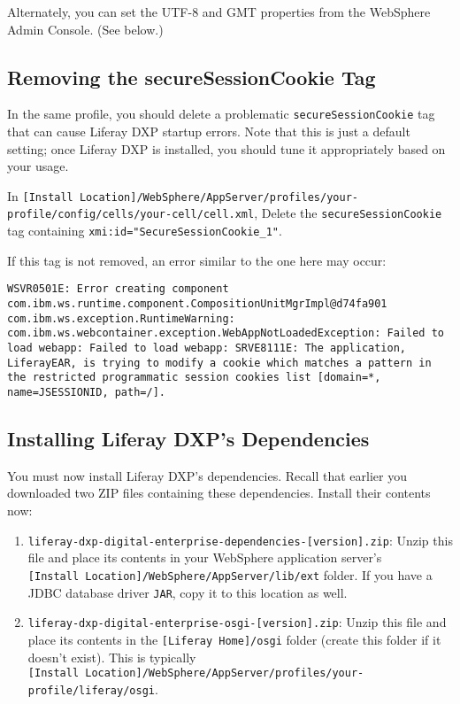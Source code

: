 \noindent\hrulefill

Alternately, you can set the UTF-8 and GMT properties from the WebSphere
Admin Console. (See below.)

\subsection{Removing the secureSessionCookie
Tag}\label{removing-the-securesessioncookie-tag}

In the same profile, you should delete a problematic
\texttt{secureSessionCookie} tag that can cause Liferay DXP startup
errors. Note that this is just a default setting; once Liferay DXP is
installed, you should tune it appropriately based on your usage.

In
\texttt{{[}Install\ Location{]}/WebSphere/AppServer/profiles/your-profile/config/cells/your-cell/cell.xml},
Delete the \texttt{secureSessionCookie} tag containing
\texttt{xmi:id="SecureSessionCookie\_1"}.

If this tag is not removed, an error similar to the one here may occur:

\begin{verbatim}
WSVR0501E: Error creating component com.ibm.ws.runtime.component.CompositionUnitMgrImpl@d74fa901    
com.ibm.ws.exception.RuntimeWarning: com.ibm.ws.webcontainer.exception.WebAppNotLoadedException: Failed to load webapp: Failed to load webapp: SRVE8111E: The application, LiferayEAR, is trying to modify a cookie which matches a pattern in the restricted programmatic session cookies list [domain=*, name=JSESSIONID, path=/].
\end{verbatim}

\subsection{Installing Liferay DXP's
Dependencies}\label{installing-liferay-dxps-dependencies}

You must now install Liferay DXP's dependencies. Recall that earlier you
downloaded two ZIP files containing these dependencies. Install their
contents now:

\begin{enumerate}
\def\labelenumi{\arabic{enumi}.}
\item
  \texttt{liferay-dxp-digital-enterprise-dependencies-{[}version{]}.zip}:
  Unzip this file and place its contents in your WebSphere application
  server's \texttt{{[}Install\ Location{]}/WebSphere/AppServer/lib/ext}
  folder. If you have a JDBC database driver \texttt{JAR}, copy it to
  this location as well.
\item
  \texttt{liferay-dxp-digital-enterprise-osgi-{[}version{]}.zip}: Unzip
  this file and place its contents in the
  \texttt{{[}Liferay\ Home{]}/osgi} folder (create this folder if it
  doesn't exist). This is typically
  \texttt{{[}Install\ Location{]}/WebSphere/AppServer/profiles/your-profile/liferay/osgi}.
\end{enumerate}

